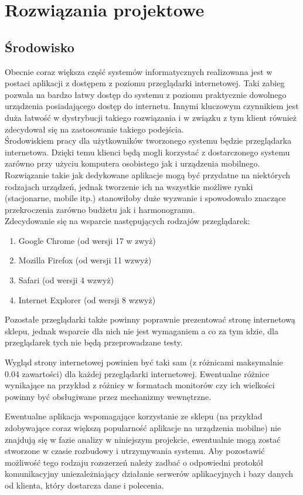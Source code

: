 \section{Rozwiązania projektowe}


\subsection {Środowisko}
Obecnie coraz większa część systemów informatycznych realizowana jest w postaci aplikacji z dostępem z poziomu przeglądarki internetowej.
Taki zabieg pozwala na bardzo łatwy dostęp do systemu z poziomu praktycznie dowolnego urządzenia posiadającego dostęp do internetu.
Innymi kluczowym czynnikiem jest duża łatwość w dystrybucji takiego rozwiązania i w związku z tym klient również zdecydował się na zastosowanie
takiego podejścia.\\
Środowiskiem pracy dla użytkowników tworzonego systemu będzie przeglądarka internetowa. Dzięki temu klienci będą mogli korzystać z dostarczonego systemu
zarówno przy użyciu komputera osobistego jak i urządzenia mobilnego. Rozwiązanie takie jak dedykowane aplikacje mogą być przydatne na niektórych rodzajach urządzeń,
jednak tworzenie ich na wszystkie możliwe rynki (stacjonarne, mobile itp.) stanowiłoby duże wyzwanie i spowodowało znaczące przekroczenia zarówno budżetu
jak i harmonogramu.\\
Zdecydowanie się na wsparcie następujących rodzajów przeglądarek:
\begin{enumerate}
\item Google Chrome (od wersji 17 w zwyż)
\item Mozilla Firefox (od wersji 11 wzwyż)
\item Safari (od wersji 4 wzwyż)
\item Internet Explorer (od wersji 8 wzwyż)
\end{enumerate}

Pozostałe przeglądarki także powinny poprawnie prezentować stronę internetową
sklepu, jednak wsparcie dla nich nie jest wymaganiem a co za tym idzie, dla
przeglądarek tych nie będą przeprowadzane testy. 

Wygląd strony internetowej powinien być taki sam (z różnicami maksymalnie 0.04%
zawartości) dla każdej przeglądarki internetowej. Ewentualne różnice wynikające
na przykład z różnicy w formatach monitorów czy ich wielkości powinny być
obsługiwane przez mechanizmy wewnętrzne.

Ewentualne aplikacja wspomagające korzystanie ze sklepu (na przykład
zdobywające coraz większą popularność aplikacje na urządzenia mobilne) nie
znajdują się w fazie analizy w niniejszym projekcie, ewentualnie mogą zostać
stworzone w czasie rozbudowy i utrzymywania systemu. Aby pozostawić możliwość
tego rodzaju rozszerzeń należy zadbać o odpowiedni protokół komunikacyjny
uniezależniający działanie serwerów aplikacyjnych i bazy danych od klienta,
który dostarcza dane i polecenia.